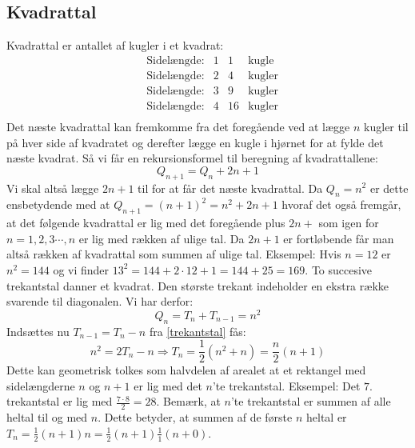 \subsection{Kvadrattal}
Kvadrattal er antallet af kugler i et kvadrat:
\begin{equation*}
\begin{array}{lllll}
&\text{Sidelængde:} &1 &1 &\text{kugle}\\
&\text{Sidelængde:} &2 &4 &\text{kugler}\\
&\text{Sidelængde:} &3 &9 &\text{kugler}\\
&\text{Sidelængde:} &4 &16 &\text{kugler}\\
\end{array}
\end{equation*}
Det næste kvadrattal kan fremkomme fra det foregående ved at lægge \(n\) kugler til på hver side af kvadratet og derefter lægge en kugle i hjørnet for at fylde det næste kvadrat. Så vi får en rekursionsformel til beregning af kvadrattallene:
\begin{equation}
Q_{n+1}=Q_{n}+2n+1\label{kvadrattal}
\end{equation}
Vi skal altså lægge \(2n+1\) til for at får det næste kvadrattal.
Da \(Q_{n}=n^{2}\) er dette ensbetydende med at \(Q_{n+1}=(n+1)^{2}=n^{2}+2n+1\) hvoraf det også fremgår, at det følgende kvadrattal er lig med det foregående plus \(2n+\) som igen for \(n=1,2,3 \dotsm ,n\) er lig med rækken af ulige tal. Da \(2n+1\) er fortløbende får man altså rækken af kvadrattal som summen af ulige tal. Eksempel: Hvis \(n=12\) er \(n^{2}=144\) og vi finder \(13^{2}=144+2 \cdot 12 + 1=144+25 =169\). 
To succesive trekantstal danner et kvadrat. Den største trekant indeholder en ekstra række svarende til diagonalen. Vi har derfor:
\begin{equation}
Q_{n}=T_{n}+T_{n-1}=n^{2}\label{trekantkvadrat}
\end{equation}
Indsættes nu \(T_{n-1}=T_{n}-n\) fra \ref{trekantstal} fås:
\[n^{2}=2T_{n}-n \Rightarrow T_{n}=\frac{1}{2}(n^{2}+n)=\frac{n}{2}(n+1)\]
Dette kan geometrisk tolkes som halvdelen af arealet at et rektangel med sidelængderne \(n\) og \(n+1\) er lig med det \(n\)'te trekantstal. Eksempel: Det \(7.\) trekantstal er lig med \(\frac {7 \cdot 8}{2}=28\).
Bemærk, at \(n\)'te trekantstal er summen af alle heltal til og med \(n\). Dette betyder, at summen af de første \(n\) heltal er \(T_{n}=\frac{1}{2}(n+1)n=\frac{1}{2}(n+1)\frac{1}{1}(n+0)\).
